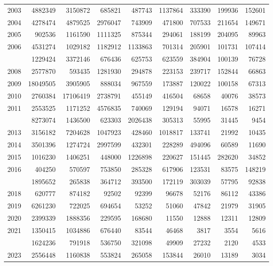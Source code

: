\documentclass[
]{article}
\begin{document}
\begin{longtable}[t]{lrrrrrrrr}
2003 & 4882349 & 3150872 & 685821 & 487743 & 1137864 & 333390 & 199936 & 152601\\
2004 & 4278474 & 4879525 & 2976047 & 743909 & 471800 & 707533 & 211654 & 149671\\
2005 & 902536 & 1161590 & 1111325 & 875344 & 294061 & 188199 & 204095 & 89963\\
2006 & 4531274 & 1029182 & 1182912 & 1133863 & 701314 & 205901 & 101731 & 107414\\
\addlinespace
2007 & 1229424 & 3372146 & 676436 & 625753 & 623559 & 384904 & 100139 & 76728\\
2008 & 2577870 & 593435 & 1281930 & 294878 & 223153 & 239717 & 152844 & 66863\\
2009 & 18049505 & 3905905 & 888034 & 967559 & 173887 & 120022 & 100158 & 67313\\
2010 & 2760384 & 17106419 & 2738791 & 455149 & 416504 & 68658 & 40076 & 38573\\
2011 & 2553525 & 1171252 & 4576835 & 740069 & 129194 & 94071 & 16578 & 16271\\
\addlinespace
2012 & 8273074 & 1436500 & 623303 & 2026438 & 305313 & 55995 & 31445 & 9454\\
2013 & 3156182 & 7204628 & 1047923 & 428460 & 1018817 & 133741 & 21992 & 10435\\
2014 & 3501396 & 1274724 & 2997599 & 432301 & 228289 & 494096 & 60589 & 11690\\
2015 & 1016230 & 1406251 & 448000 & 1226898 & 220627 & 151445 & 282620 & 34852\\
2016 & 404250 & 570597 & 753850 & 285328 & 617906 & 123531 & 83575 & 148219\\
\addlinespace
2017 & 1895652 & 265838 & 364712 & 393500 & 172119 & 303039 & 57795 & 92838\\
2018 & 620777 & 874182 & 92502 & 92399 & 96678 & 52176 & 86112 & 43386\\
2019 & 6261230 & 722025 & 694654 & 53252 & 51060 & 47842 & 21979 & 31905\\
2020 & 2399339 & 1888356 & 229595 & 168680 & 11550 & 12888 & 12311 & 12809\\
2021 & 1350415 & 1034886 & 676440 & 83544 & 46468 & 3817 & 3554 & 5616\\
\addlinespace
2022 & 1624236 & 791918 & 536750 & 321098 & 49909 & 27232 & 2120 & 4533\\
2023 & 2556448 & 1160838 & 553824 & 265058 & 153844 & 26010 & 13189 & 3034\\*
\end{longtable}
\end{document}
